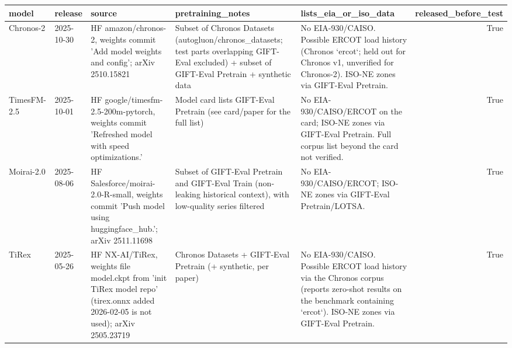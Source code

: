 \begin{tabular}{lllllr}
\toprule
model & release & source & pretraining_notes & lists_eia_or_iso_data & released_before_test \\
\midrule
Chronos-2 & 2025-10-30 & HF amazon/chronos-2, weights commit 'Add model weights and config'; arXiv 2510.15821 & Subset of Chronos Datasets (autogluon/chronos_datasets; test parts overlapping GIFT-Eval excluded) + subset of GIFT-Eval Pretrain + synthetic data & No EIA-930/CAISO. Possible ERCOT load history (Chronos `ercot`; held out for Chronos v1, unverified for Chronos-2). ISO-NE zones via GIFT-Eval Pretrain. & True \\
TimesFM-2.5 & 2025-10-01 & HF google/timesfm-2.5-200m-pytorch, weights commit 'Refreshed model with speed optimizations.' & Model card lists GIFT-Eval Pretrain (see card/paper for the full list) & No EIA-930/CAISO/ERCOT on the card; ISO-NE zones via GIFT-Eval Pretrain. Full corpus list beyond the card not verified. & True \\
Moirai-2.0 & 2025-08-06 & HF Salesforce/moirai-2.0-R-small, weights commit 'Push model using huggingface_hub.'; arXiv 2511.11698 & Subset of GIFT-Eval Pretrain and GIFT-Eval Train (non-leaking historical context), with low-quality series filtered & No EIA-930/CAISO/ERCOT; ISO-NE zones via GIFT-Eval Pretrain/LOTSA. & True \\
TiRex & 2025-05-26 & HF NX-AI/TiRex, weights file model.ckpt from 'init TiRex model repo' (tirex.onnx added 2026-02-05 is not used); arXiv 2505.23719 & Chronos Datasets + GIFT-Eval Pretrain (+ synthetic, per paper) & No EIA-930/CAISO. Possible ERCOT load history via the Chronos corpus (reports zero-shot results on the benchmark containing `ercot`). ISO-NE zones via GIFT-Eval Pretrain. & True \\
\bottomrule
\end{tabular}
